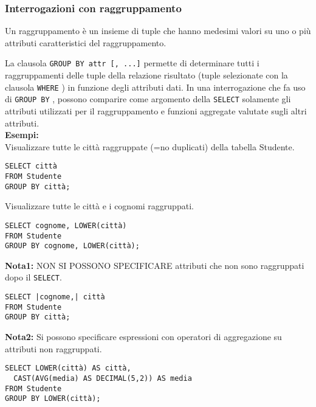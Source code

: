 \documentclass[a4paper, 10pt, titlepage]{article}
\begin{document}
	\subsubsection{Interrogazioni con raggruppamento}
		Un raggruppamento è un insieme di tuple che hanno medesimi valori su
		uno o più attributi caratteristici del raggruppamento.
		
		\noindent
		La clausola \lstinline|GROUP BY attr [, ...]| permette di determinare tutti i
		raggruppamenti delle tuple della relazione risultato (tuple selezionate
		con la clausola \lstinline|WHERE| ) in funzione degli attributi dati.
		In una interrogazione che fa uso di \lstinline|GROUP BY| , possono comparire come
		argomento della \lstinline|SELECT| solamente gli attributi utilizzati per il
		raggruppamento e funzioni aggregate valutate sugli altri attributi.\medskip \\
		\textbf{Esempi: }\\		
		Visualizzare tutte le città raggruppate (=no duplicati) della tabella Studente.
		\begin{lstlisting}
SELECT città
FROM Studente
GROUP BY città;
		\end{lstlisting}
		Visualizzare tutte le città e i cognomi raggruppati.
		\begin{lstlisting}[mathescape]
SELECT cognome, LOWER(città)
FROM Studente
GROUP BY cognome, LOWER(città);
		\end{lstlisting}
		\textbf{Nota1: }NON SI POSSONO SPECIFICARE attributi che non sono raggruppati dopo il
		\lstinline|SELECT|.
		
		\begin{lstlisting}
SELECT |cognome,| città
FROM Studente
GROUP BY città;
		\end{lstlisting}
		
		\noindent
		\textbf{Nota2: }Si possono specificare espressioni con operatori di aggregazione su attributi
		non raggruppati.
		\begin{lstlisting}
SELECT LOWER(città) AS città,
  CAST(AVG(media) AS DECIMAL(5,2)) AS media
FROM Studente
GROUP BY LOWER(città);
		\end{lstlisting}
		
\end{document}
